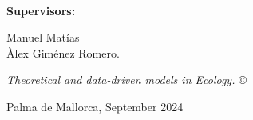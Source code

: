 \documentclass[
	11pt, %
	a4paper, %
]{LegrandOrangeBook}
\begin{document}
\frontmatter %








\thispagestyle{empty} %

~\vfill %
\sffamily

\noindent \textbf{Supervisors:}

\noindent Manuel Matías \\

\noindent Àlex Giménez Romero.

\noindent \textit{Theoretical and data-driven models in Ecology.} \copyright

\noindent Palma de Mallorca, September 2024
\pagebreak


\newpage
\thispagestyle{plain} %
\mbox{}


\newpage
\thispagestyle{plain} %
\mbox{}

\newpage
\thispagestyle{plain} %
\mbox{}


{
	\noindent
	
}
\newpage
\thispagestyle{plain} %
\mbox{}
\end{document}
